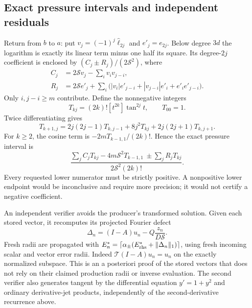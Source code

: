 \documentclass[11pt,a4paper]{article}
\theoremstyle{remark}\newtheorem*{ednote}{Editorial note (ProveIt, 2026-10-01)}
\begin{document}
\subsection{Exact pressure intervals and independent residuals}
Return from $b$ to $a$: put $v_j=(-1)^j\widehat\ell_{2j}$ and $e'_j=e_{2j}$. Below degree $3d$ the logarithm is exactly its linear term minus one half its square. Its degree-$2j$ coefficient is enclosed by $(C_j\pm R_j)/(2\mathcal S^2)$, where
\begin{align*}
 C_j&=2\mathcal S v_j-\sum_i v_iv_{j-i},\\
 R_j&=2\mathcal S e'_j+
 \sum_i\bigl(|v_i|e'_{j-i}+|v_{j-i}|e'_i+e'_ie'_{j-i}\bigr).
\end{align*}
Only $i,j-i\ge m$ contribute. Define the nonnegative integers
\[
 T_{kj}=(2k)![t^{2k}]\tan^{2j}t,\qquad T_{00}=1.
\]
Twice differentiating gives
\[
 T_{k+1,j}=2j(2j-1)T_{k,j-1}+8j^2T_{kj}+2j(2j+1)T_{k,j+1}.
\]
For $k\ge2$, the cosine term is $-2mT_{k-1,1}/(2k)!$. Hence the exact pressure interval is
\begin{equation}\label{eq:finiteinterval}
 \frac{\displaystyle\sum_j C_jT_{kj}-4m\mathcal S^2T_{k-1,1}
       \ \pm\displaystyle\sum_jR_jT_{kj}}
      {2\mathcal S^2(2k)!}.
\end{equation}
Every requested lower numerator must be strictly positive. A nonpositive lower endpoint would be inconclusive and require more precision; it would not certify a negative coefficient.

An independent verifier avoids the producer's transformed solution. Given each stored vector, it recomputes its projected Fourier defect
\[
 \Delta_n=(I-A)u_n-Q\frac{z_n}{D\mathcal S}.
\]
Fresh radii are propagated with
$E_n^*=\lceil\alpha_\pm(E_{\rm rhs}^*+\|\Delta_n\|_1)\rceil$,
using fresh incoming scalar and vector error radii. Indeed $\mathcal T(I-A)u_n=u_n$ on the exactly normalized subspace. This is an a posteriori proof of the stored vectors that does not rely on their claimed production radii or inverse evaluation. The second verifier also generates tangent by the differential equation $y'=1+y^2$ and ordinary derivative-jet products, independently of the second-derivative recurrence above.
\end{document}
